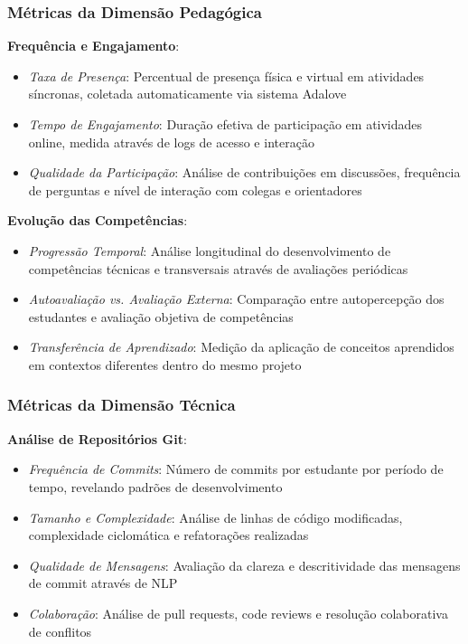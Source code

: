 \documentclass[12pt, a4paper, oneside, brazilian]{abntex2}
\begin{document}
\subsubsection{Métricas da Dimensão Pedagógica}

\textbf{Frequência e Engajamento}: 
\begin{itemize}
\item \textit{Taxa de Presença}: Percentual de presença física e virtual em atividades síncronas, coletada automaticamente via sistema Adalove
\item \textit{Tempo de Engajamento}: Duração efetiva de participação em atividades online, medida através de logs de acesso e interação
\item \textit{Qualidade da Participação}: Análise de contribuições em discussões, frequência de perguntas e nível de interação com colegas e orientadores
\end{itemize}

\textbf{Evolução das Competências}:
\begin{itemize}
\item \textit{Progressão Temporal}: Análise longitudinal do desenvolvimento de competências técnicas e transversais através de avaliações periódicas
\item \textit{Autoavaliação vs. Avaliação Externa}: Comparação entre autopercepção dos estudantes e avaliação objetiva de competências
\item \textit{Transferência de Aprendizado}: Medição da aplicação de conceitos aprendidos em contextos diferentes dentro do mesmo projeto
\end{itemize}

\subsubsection{Métricas da Dimensão Técnica}

\textbf{Análise de Repositórios Git}:
\begin{itemize}
\item \textit{Frequência de Commits}: Número de commits por estudante por período de tempo, revelando padrões de desenvolvimento
\item \textit{Tamanho e Complexidade}: Análise de linhas de código modificadas, complexidade ciclomática e refatorações realizadas
\item \textit{Qualidade de Mensagens}: Avaliação da clareza e descritividade das mensagens de commit através de NLP
\item \textit{Colaboração}: Análise de pull requests, code reviews e resolução colaborativa de conflitos
\end{itemize}
\end{document}
